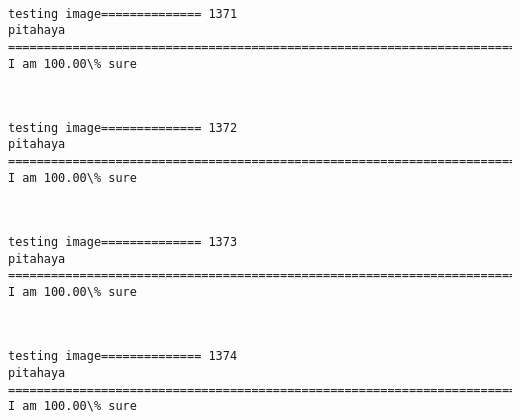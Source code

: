 \documentclass[11pt]{article}
\begin{document}
    \begin{center}
    \end{center}
    { \hspace*{\fill} \\}
    
    \begin{Verbatim}[commandchars=\\\{\}]
testing image============== 1371
pitahaya
============================================================================
I am 100.00\% sure

    \end{Verbatim}

    \begin{center}
    \end{center}
    { \hspace*{\fill} \\}
    
    \begin{Verbatim}[commandchars=\\\{\}]
testing image============== 1372
pitahaya
============================================================================
I am 100.00\% sure

    \end{Verbatim}

    \begin{center}
    \end{center}
    { \hspace*{\fill} \\}
    
    \begin{Verbatim}[commandchars=\\\{\}]
testing image============== 1373
pitahaya
============================================================================
I am 100.00\% sure

    \end{Verbatim}

    \begin{center}
    \end{center}
    { \hspace*{\fill} \\}
    
    \begin{Verbatim}[commandchars=\\\{\}]
testing image============== 1374
pitahaya
============================================================================
I am 100.00\% sure

    \end{Verbatim}
\end{document}
